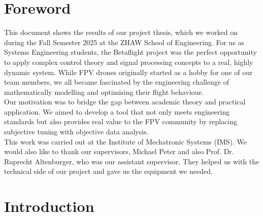 \documentclass{article}
\begin{document}
\section{Foreword}
This document shows the results of our project thesis, which we worked on during the Fall Semester 2025 at the ZHAW School of Engineering. For us as Systems Engineering students, the Betaflight project was the perfect opportunity to apply complex control theory and signal processing concepts to a real, highly dynamic system. While FPV drones originally started as a hobby for one of our team members, we all became fascinated by the engineering challenge of mathematically modelling and optimising their flight behaviour. \\
Our motivation was to bridge the gap between academic theory and practical application. We aimed to develop a tool that not only meets engineering standards but also provides real value to the FPV community by replacing subjective tuning with objective data analysis. \\
This work was carried out at the Institute of Mechatronic Systems (IMS). We would also like to thank our supervisors, Michael Peter and also Prof. Dr. Ruprecht Altenburger, who was our assistant supervisor. They helped us with the technical side of our project and gave us the equipment we needed.

\newpage

\tableofcontents

\newpage

\section{Introduction}
\end{document}
